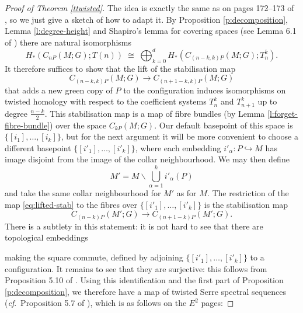 \documentclass[reqno,a4paper]{article}
\numberwithin{equation}{section}
\theoremstyle{italicised}
\theoremstyle{upright}
\theoremstyle{italicised-restate}
\newcommand{\cf}{\textit{cf}.\ }
\newcommand{\incl}[3][right]%
{%
\draw[<-,>=#1 hook] #2 to ($ #2!0.5!#3 $);
\draw[->] ($ #2!0.5!#3 $) to #3;%
}
\begin{document}
\begin{proof}[Proof of Theorem \ref{ttwisted}]
The idea is exactly the same as on pages 172--173 of \cite{Palmer2018Twistedhomologicalstability}, so we just give a sketch of how to adapt it. By Proposition \ref{p:decomposition}, Lemma \ref{l:degree-height} and Shapiro's lemma for covering spaces (see Lemma 6.1 of \cite{Palmer2018Twistedhomologicalstability}) there are natural isomorphisms
\begin{equation}\label{eq:first-step}
H_*(C_{nP}(M;G);T(n)) \;\cong\; \bigoplus_{k=0}^d H_*(C_{(n-k,k)P}(M;G);T_n^k).
\end{equation}
It therefore suffices to show that the lift of the stabilisation map
\begin{equation}\label{eq:lifted-stab}
C_{(n-k,k)P}(M;G) \longrightarrow C_{(n+1-k,k)P}(M;G)
\end{equation}
that adds a new green copy of $P$ to the configuration induces isomorphisms on twisted homology with respect to the coefficient systems $T_n^k$ and $T_{n+1}^k$ up to degree $\tfrac{n-k}{2}$. This stabilisation map is a map of fibre bundles (by Lemma \ref{l:forget-fibre-bundle}) over the space $C_{kP}(M;G)$. Our default basepoint of this space is $\{[i_1],\ldots,[i_k]\}$, but for the next argument it will be more convenient to choose a different basepoint $\{[i'_1],\ldots,[i'_k]\}$, where each embedding $i'_{\alpha} \colon P \hookrightarrow M$ has image disjoint from the image of the collar neighbourhood. We may then define
\[
M' = M \smallsetminus \bigcup_{\alpha = 1}^k i'_{\alpha}(P)
\]
and take the same collar neighbourhood for $M'$ as for $M$. The restriction of the map \eqref{eq:lifted-stab} to the fibres over $\{[i'_1],\ldots,[i'_k]\}$ is the stabilisation map
\[
C_{(n-k)P}(M';G) \longrightarrow C_{(n+1-k)P}(M';G).
\]
There is a subtlety in this statement: it is not hard to see that there are topological embeddings
\begin{center}
\end{center}
making the square commute, defined by adjoining $\{[i'_1],\ldots,[i'_k]\}$ to a configuration. It remains to see that they are surjective: this follows from Proposition 5.10 of \cite{Palmer2018HomologicalstabilitymoduliI}. Using this identification and the first part of Proposition \ref{p:decomposition}, we therefore have a map of twisted Serre spectral sequences (\cf Proposition 5.7 of \cite{Palmer2018Twistedhomologicalstability}), which is as follows on the $E^2$ pages:

\end{proof}
\end{document}

